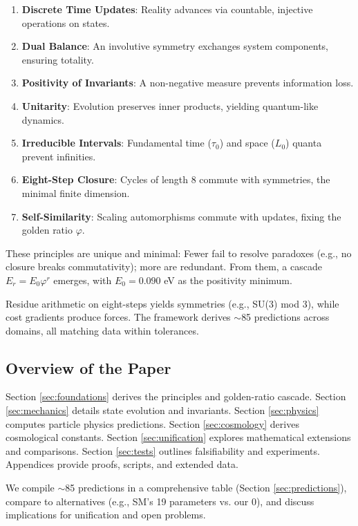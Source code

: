 \documentclass[twocolumn,prd,amsmath,amssymb,aps,superscriptaddress,nofootinbib]{revtex4-2}
\begin{document}
\begin{enumerate}
    \item \textbf{Discrete Time Updates}: Reality advances via countable, injective operations on states.
    \item \textbf{Dual Balance}: An involutive symmetry exchanges system components, ensuring totality.
    \item \textbf{Positivity of Invariants}: A non-negative measure prevents information loss.
    \item \textbf{Unitarity}: Evolution preserves inner products, yielding quantum-like dynamics.
    \item \textbf{Irreducible Intervals}: Fundamental time ($\tau_0$) and space ($L_0$) quanta prevent infinities.
    \item \textbf{Eight-Step Closure}: Cycles of length 8 commute with symmetries, the minimal finite dimension.
    \item \textbf{Self-Similarity}: Scaling automorphisms commute with updates, fixing the golden ratio $\varphi$.
\end{enumerate}

These principles are unique and minimal: Fewer fail to resolve paradoxes (e.g., no closure breaks commutativity); more are redundant. From them, a cascade $E_r = E_0 \varphi^r$ emerges, with $E_0 = 0.090$ eV as the positivity minimum.

Residue arithmetic on eight-steps yields symmetries (e.g., SU(3) mod 3), while cost gradients produce forces. The framework derives $\sim$85 predictions across domains, all matching data within tolerances.

\subsection{Overview of the Paper}
\label{subsec:overview}

Section \ref{sec:foundations} derives the principles and golden-ratio cascade. Section \ref{sec:mechanics} details state evolution and invariants. Section \ref{sec:physics} computes particle physics predictions. Section \ref{sec:cosmology} derives cosmological constants. Section \ref{sec:unification} explores mathematical extensions and comparisons. Section \ref{sec:tests} outlines falsifiability and experiments. Appendices provide proofs, scripts, and extended data.

We compile $\sim$85 predictions in a comprehensive table (Section \ref{sec:predictions}), compare to alternatives (e.g., SM's 19 parameters vs. our 0), and discuss implications for unification and open problems.
\end{document}
